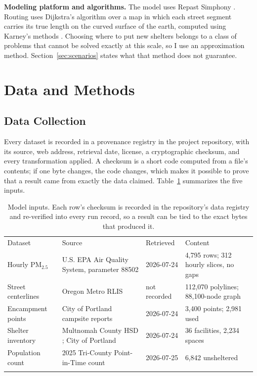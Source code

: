 \documentclass[graybox]{svmult}
\begin{document}
\textbf{Modeling platform and algorithms.} The model uses Repast Simphony
\cite{north2013}. Routing uses Dijkstra's algorithm \cite{dijkstra1959} over a
map in which each street segment carries its true length on the curved surface of
the earth, computed using Karney's methods \cite{karney2013}. Choosing where to
put new shelters belongs to a class of problems that cannot be solved exactly at
this scale, so I use an approximation method. Section~\ref{sec:scenarios} states
what that method does not guarantee.

\section{Data and Methods}
\label{sec:data}

\subsection{Data Collection}
\label{sec:collection}

Every dataset is recorded in a provenance registry in the project repository,
with its source, web address, retrieval date, license, a cryptographic checksum,
and every transformation applied. A checksum is a short code computed from a
file's contents; if one byte changes, the code changes, which makes it possible
to prove that a result came from exactly the data claimed.
Table~\ref{tab:inputs} summarizes the five inputs.

\begin{table}[t]
\caption{Model inputs. Each row's checksum is recorded in the repository's data
registry and re-verified into every run record, so a result can be tied to the
exact bytes that produced it.}
\label{tab:inputs}
\begin{tabular}{p{2.0cm}p{3.1cm}p{1.8cm}p{3.0cm}}
\hline\noalign{\smallskip}
Dataset & Source & Retrieved & Content \\
\noalign{\smallskip}\svhline\noalign{\smallskip}
Hourly PM$_{2.5}$ & U.S. EPA Air Quality System, parameter 88502 \cite{epaaqs2020} & 2026-07-24 & 4,795 rows; 312 hourly slices, no gaps \\
Street centerlines & Oregon Metro RLIS & not recorded & 112,070 polylines; 88,100-node graph \\
Encampment points & City of Portland campsite reports \cite{portlandcampsites} & 2026-07-24 & 3,400 points; 2,981 used \\
Shelter inventory & Multnomah County HSD \cite{multcohsd}; City of Portland \cite{portlandsrv} & 2026-07-24 & 36 facilities, 2,234 spaces \\
Population count & 2025 Tri-County Point-in-Time count \cite{psupit2025} & 2026-07-25 & 6,842 unsheltered \\
\noalign{\smallskip}\hline
\end{tabular}
\end{table}
\end{document}
